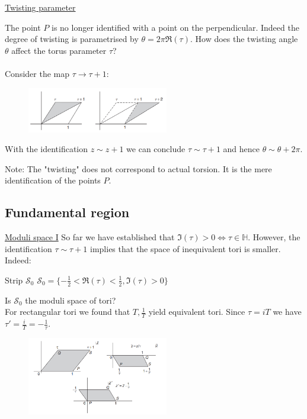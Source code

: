\documentclass[11pt,aspectratio=169]{beamer}
\begin{document}
\begin{frame}{\underline{Twisting parameter}}

	
	The point $P$ is no longer identified with a point on the perpendicular. Indeed the degree of twisting is parametrised by $\theta = 2\pi \Re(\tau)$.
	How does the twisting angle $\theta$ affect the torus parameter $\tau$?
	\\~\\
	Consider the map $\tau \rightarrow \tau + 1$:
	\begin{figure}[htbp]
		\centering
		\includegraphics[width = 0.55\textwidth]{elements/tau map.PNG}
	\end{figure}
	With the identification $z \sim z + 1$ we can conclude $\tau \sim \tau + 1$ and hence $\theta \sim \theta + 2\pi$.
	\begin{block}{Note:}
		The "twisting" does not correspond to actual torsion. It is the mere identification of the points $P$.
	\end{block}
\end{frame}

\subsection{Fundamental region}
\begin{frame}{\underline{Moduli space I}}
	So far we have established that $\Im(\tau) > 0 \Leftrightarrow \tau \in \mathbb{H}$.
	However, the identification $\tau \sim \tau + 1$ implies that the space of inequivalent tori is smaller. Indeed:
	\begin{block}{Strip $\mathcal{S}_{0}$}
		$\mathcal{S}_{0} = \{-\frac{1}{2} < \Re(\tau) < \frac{1}{2}, \Im(\tau) > 0\}$
	\end{block}
	Is $\mathcal{S}_{0}$ the moduli space of tori?
	\\
	For rectangular tori we found that $T, \frac{1}{T}$ yield equivalent tori. Since $\tau = iT$ we have $\tau' = \frac{i}{T} = -\frac{1}{\tau}$.
	\begin{figure}[htbp]
		\centering
		\includegraphics[width = 0.55\textwidth]{elements/s module trans.PNG}
	\end{figure}
\end{frame}
\end{document}
